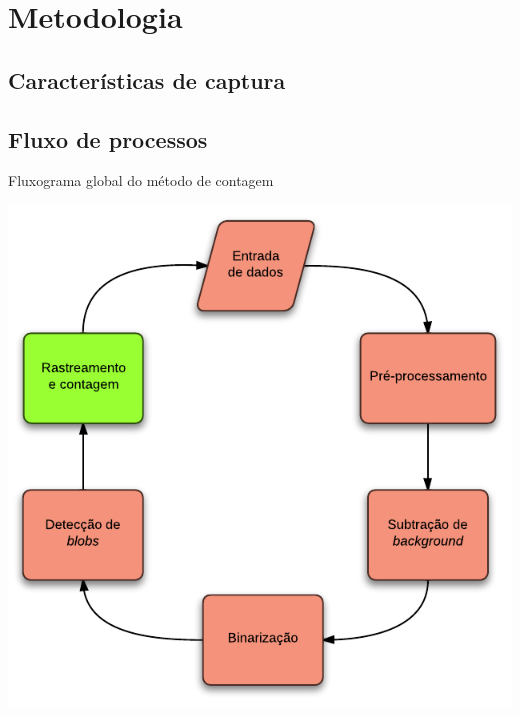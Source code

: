 \section{Metodologia} %
\label{sec:metodologia}

\subsection{Características de captura} %
\label{sub:caracter_sticas_de_captura}


\subsection{Fluxo de processos} %
\label{sub:fluxo_de_processos}

\begin{frame}{Fluxograma global do método de contagem}
  \begin{center}
    \includegraphics[scale=0.55]{imgs/general_process.pdf}
  \end{center}
\end{frame}

